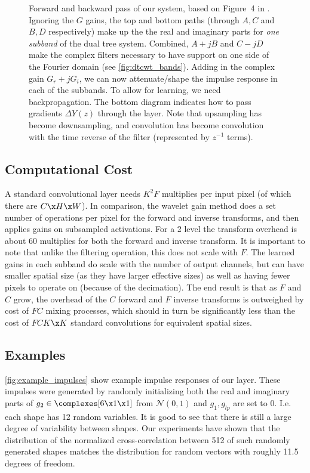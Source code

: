 \documentclass[9pt]{article}
\begin{document}
\begin{figure*}[ht]
  \centering
   \newline
  \caption{ Forward and  backward pass of our system, based on Figure~4 in
  \cite{kingsbury_complex_2001}. Ignoring the $G$ gains, the top and bottom paths (through $A, C$
  and $B, D$ respectively) make up the the real and imaginary parts for \emph{one subband} of the dual tree system.
  Combined, $A+jB$ and $C-jD$ make the complex filters necessary to have support on one side of the
  Fourier domain (see \autoref{fig:dtcwt_bands}). Adding in the complex gain $G_r + jG_i$, we can now
  attenuate/shape the impulse response in each of the subbands. To allow for learning, we need
  backpropagation. The bottom diagram indicates how to pass gradients $\Delta Y(z)$ through the
  layer. Note that upsampling has become downsampling, and convolution has become convolution with
  the time reverse of the filter (represented by $z^{-1}$ terms).}
  \label{fig:fwd_bwd}
  \vspace{-5mm}
\end{figure*}\subsection{Computational Cost}
A standard convolutional layer needs $K^2 F$ multiplies per input pixel (of which there are $C\x H\x
W$). In comparison, the wavelet gain method does a set number of operations per pixel for the
forward and inverse transforms, and then applies gains on subsampled activations. For a 2 level
\DTCWT the transform overhead is about 60 multiplies for both the forward and inverse transform. It
is important to note that unlike the filtering operation, this does not scale with $F$. The learned
gains in each subband do scale with the number of output channels, but can have smaller spatial size
(as they have larger effective sizes) as well as having fewer pixels to operate on (because of the
decimation). The end result is that as $F$ and $C$ grow, the overhead of the $C$ forward and $F$
inverse transforms is outweighed by cost of $FC$ mixing processes, which should in turn be
significantly less than the cost of $FC$$K\x K$ standard convolutions for equivalent spatial sizes.
\subsection{Examples}\autoref{fig:example_impulses} show example impulse responses of our layer. These impulses were generated by
randomly initializing both the real and imaginary parts of $g_2 \in \complexes[6\x 1\x 1]$ 
from $\mathcal{N}(0,1)$ and $g_1, g_{lp}$ are set to 0. I.e. each shape has 12 random variables. It
is good to see that there is still a large degree of variability between shapes. Our experiments
have shown that the distribution of the normalized cross-correlation between 512 of such randomly generated shapes
matches the distribution for random vectors with roughly 11.5 degrees of freedom.
\end{document}
